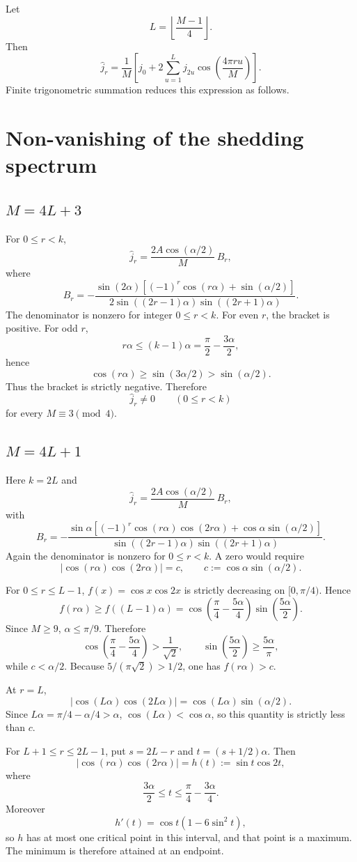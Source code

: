 \documentclass[11pt]{article}
\begin{document}
Let
\[
L=\left\lfloor\frac{M-1}{4}\right\rfloor.
\]
Then
\[
\widehat j_r=\frac{1}{M}\left[j_0+2\sum_{u=1}^{L}j_{2u}\cos\!\left(\frac{4\pi r u}{M}\right)\right].
\]
Finite trigonometric summation reduces this expression as follows.

\section{Non-vanishing of the shedding spectrum}
\subsection{$M=4L+3$}
For $0\le r<k$,
\[
\widehat j_r=\frac{2A\cos(\alpha/2)}{M}\,B_r,
\]
where
\[
B_r=
-\frac{\sin(2\alpha)\left[(-1)^r\cos(r\alpha)+\sin(\alpha/2)\right]}
{2\sin((2r-1)\alpha)\sin((2r+1)\alpha)}.
\]
The denominator is nonzero for integer $0\le r<k$. For even $r$, the bracket is positive. For odd $r$,
\[
r\alpha\le (k-1)\alpha=\frac{\pi}{2}-\frac{3\alpha}{2},
\]
hence
\[
\cos(r\alpha)\ge \sin(3\alpha/2)>\sin(\alpha/2).
\]
Thus the bracket is strictly negative. Therefore
\[
\boxed{\widehat j_r\ne 0\qquad(0\le r<k)}
\]
for every $M\equiv3\pmod4$.

\subsection{$M=4L+1$}
Here $k=2L$ and
\[
\widehat j_r=\frac{2A\cos(\alpha/2)}{M}\,B_r,
\]
with
\[
B_r=
-\frac{\sin\alpha\left[(-1)^r\cos(r\alpha)\cos(2r\alpha)+\cos\alpha\sin(\alpha/2)\right]}
{\sin((2r-1)\alpha)\sin((2r+1)\alpha)}.
\]
Again the denominator is nonzero for $0\le r<k$. A zero would require
\[
\left|\cos(r\alpha)\cos(2r\alpha)\right|=c,
\qquad c:=\cos\alpha\sin(\alpha/2).
\]

For $0\le r\le L-1$, $f(x)=\cos x\cos2x$ is strictly decreasing on $[0,\pi/4)$. Hence
\[
f(r\alpha)\ge f((L-1)\alpha)
=\cos\!\left(\frac\pi4-\frac{5\alpha}{4}\right)\sin\!\left(\frac{5\alpha}{2}\right).
\]
Since $M\ge9$, $\alpha\le\pi/9$. Therefore
\[
\cos\!\left(\frac\pi4-\frac{5\alpha}{4}\right)>\frac1{\sqrt2},
\qquad
\sin\!\left(\frac{5\alpha}{2}\right)\ge\frac{5\alpha}{\pi},
\]
while $c<\alpha/2$. Because $5/(\pi\sqrt2)>1/2$, one has $f(r\alpha)>c$.

At $r=L$,
\[
\left|\cos(L\alpha)\cos(2L\alpha)\right|
=\cos(L\alpha)\sin(\alpha/2).
\]
Since $L\alpha=\pi/4-\alpha/4>\alpha$, $\cos(L\alpha)<\cos\alpha$, so this quantity is strictly less than $c$.

For $L+1\le r\le2L-1$, put $s=2L-r$ and $t=(s+1/2)\alpha$. Then
\[
\left|\cos(r\alpha)\cos(2r\alpha)\right|=h(t):=\sin t\cos2t,
\]
where
\[
\frac{3\alpha}{2}\le t\le \frac\pi4-\frac{3\alpha}{4}.
\]
Moreover
\[
h'(t)=\cos t\left(1-6\sin^2 t\right),
\]
so $h$ has at most one critical point in this interval, and that point is a maximum. The minimum is therefore attained at an endpoint.
\end{document}
